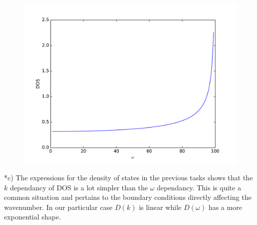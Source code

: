 \documentclass[a4paper]{article}
\begin{document}
\begin{section}
\begin{subsection}
\begin{align*}
		\end{align*}
		\begin{figure}[H]
			\includegraphics[width = 0.8\linewidth]{2b.pdf}
			\centering
		\end{figure}
	\end{subsection}
	\begin{subsection}*{c)}
		The expressions for the density of states in the previous tasks shows that the $k$ dependancy of DOS is a lot simpler than the $\omega$ dependancy. This is quite a common situation and pertains to the boundary conditions directly affecting the wavenumber. In our particular case $D(k)$ is linear while $D(\omega)$ has a more exponential shape.
	\end{subsection}
\end{section}
\end{document}
